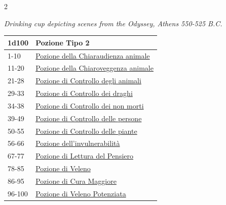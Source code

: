\begin{multicols}{2}
{\begin{center}
\emph{Drinking cup depicting scenes from the Odyssey, Athens 550-525 B.C.}
\end{center}
\hypertarget{Pozione Tipo 2}{}
{\small\begin{tabularx}{\linewidth}{ll}
		\toprule
\rowcolor{gray!20}\textbf{1d100} & \textbf{Pozione Tipo 2}\\
\toprule
1-10 & \hyperlink{Pozione della Chiaraudienza animale}{Pozione della Chiaraudienza animale}\\
\rowcolor{gray!20}11-20 & \hyperlink{Pozione della Chiaroveggenza animale}{Pozione della Chiaroveggenza animale}\\
21-28 & \hyperlink{Pozione di Controllo degli animali}{Pozione di Controllo degli animali}\\
\rowcolor{gray!20}29-33 & \hyperlink{Pozione di Controllo dei draghi}{Pozione di Controllo dei draghi}\\
34-38 & \hyperlink{Pozione di Controllo dei non morti}{Pozione di Controllo dei non morti}\\
\rowcolor{gray!20}39-49 & \hyperlink{Pozione di Controllo delle persone}{Pozione di Controllo delle persone}\\
50-55 & \hyperlink{Pozione di Controllo delle piante}{Pozione di Controllo delle piante}\\
\rowcolor{gray!20}56-66 & \hyperlink{Pozione dell'invulnerabilità}{Pozione dell'invulnerabilità}\\
67-77 & \hyperlink{Pozione di Lettura del Pensiero}{Pozione di Lettura del Pensiero}\\
\rowcolor{gray!20}78-85 & \hyperlink{Pozione di Veleno}{Pozione di Veleno}\\
86-95 & \hyperlink{pozionifiltri}{Pozione di Cura Maggiore}\\
\rowcolor{gray!20}96-100 & \hyperlink{pozionifiltri}{Pozione di Veleno Potenziata}
\end{tabularx}}

\medskip\hypertarget{Pozione Tipo 3}{}

}
\end{multicols}
